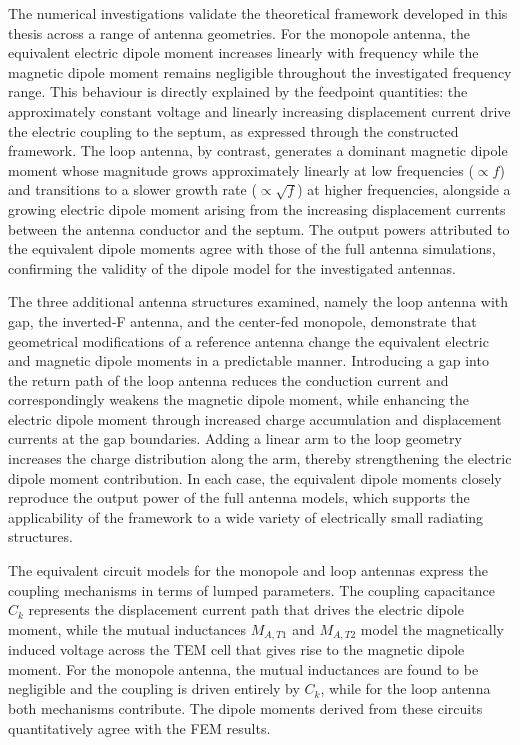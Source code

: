 The numerical investigations validate the theoretical framework developed in this thesis across a range of antenna geometries. For the monopole antenna, the equivalent electric dipole moment increases linearly with frequency while the magnetic dipole moment remains negligible throughout the investigated frequency range. This behaviour is directly explained by the feedpoint quantities: the approximately constant voltage and linearly increasing displacement current drive the electric coupling to the septum, as expressed through the constructed framework. The loop antenna, by contrast, generates a dominant magnetic dipole moment whose magnitude grows approximately linearly at low frequencies ($\propto f$) and transitions to a slower growth rate ($\propto \sqrt{f}$) at higher frequencies, alongside a growing electric dipole moment arising from the increasing displacement currents between the antenna conductor and the septum. The output powers attributed to the equivalent dipole moments agree with those of the full antenna simulations, confirming the validity of the dipole model for the investigated antennas.

The three additional antenna structures examined, namely the loop antenna with gap, the inverted-F antenna, and the center-fed monopole, demonstrate that geometrical modifications of a reference antenna change the equivalent electric and magnetic dipole moments in a predictable manner. Introducing a gap into the return path of the loop antenna reduces the conduction current and correspondingly weakens the magnetic dipole moment, while enhancing the electric dipole moment through increased charge accumulation and displacement currents at the gap boundaries. Adding a linear arm to the loop geometry increases the charge distribution along the arm, thereby strengthening the electric dipole moment contribution. In each case, the equivalent dipole moments closely reproduce the output power of the full antenna models, which supports the applicability of the framework to a wide variety of electrically small radiating structures.

The equivalent circuit models for the monopole and loop antennas express the coupling mechanisms in terms of lumped parameters. The coupling capacitance $C_k$ represents the displacement current path that drives the electric dipole moment, while the mutual inductances $M_{A,T1}$ and $M_{A,T2}$ model the magnetically induced voltage across the TEM cell that gives rise to the magnetic dipole moment. For the monopole antenna, the mutual inductances are found to be negligible and the coupling is driven entirely by $C_k$, while for the loop antenna both mechanisms contribute. The dipole moments derived from these circuits quantitatively agree with the FEM results.

